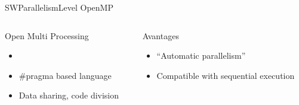 %
\begin{Frame}{SWParallelismLevel OpenMP}
  \begin{columns}[t]
    \begin{column}{\HW} %
      \begin{block}{Open Multi Processing}
        \begin{itemize}
        \item {}
        \item \#pragma based language
        \item Data sharing, code division
        \end{itemize}
      \end{block} 
    \end{column}
    
    \begin{column}{\HW} %
      \begin{alertblock}{Avantages}
        \begin{itemize}
        \item ``Automatic parallelism''
        \item Compatible with sequential execution
        \end{itemize}
      \end{alertblock}   
    \end{column}
  \end{columns}  
\end{Frame}


